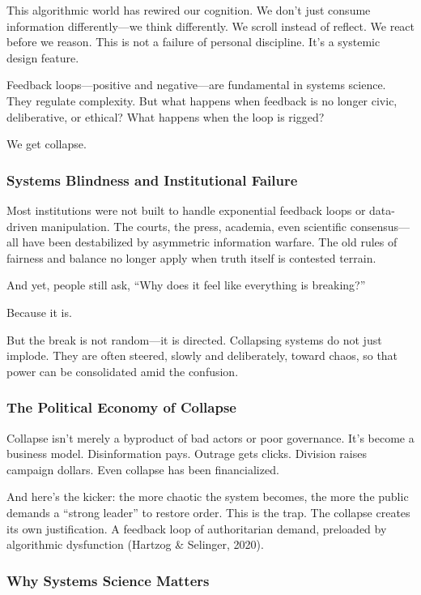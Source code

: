 This algorithmic world has rewired our cognition. We don't just consume information differently---we think differently. We scroll instead of reflect. We react before we reason. This is not a failure of personal discipline. It's a systemic design feature.

Feedback loops---positive and negative---are fundamental in systems science. They regulate complexity. But what happens when feedback is no longer civic, deliberative, or ethical? What happens when the loop is rigged?

We get collapse.

\subsubsection{Systems Blindness and Institutional Failure}\label{systems-blindness-and-institutional-failure}

Most institutions were not built to handle exponential feedback loops or data-driven manipulation. The courts, the press, academia, even scientific consensus---all have been destabilized by asymmetric information warfare. The old rules of fairness and balance no longer apply when truth itself is contested terrain.

And yet, people still ask, ``Why does it feel like everything is breaking?''

Because it is.

But the break is not random---it is directed. Collapsing systems do not just implode. They are often steered, slowly and deliberately, toward chaos, so that power can be consolidated amid the confusion.

\subsubsection{The Political Economy of Collapse}\label{the-political-economy-of-collapse}

Collapse isn't merely a byproduct of bad actors or poor governance. It's become a business model. Disinformation pays. Outrage gets clicks. Division raises campaign dollars. Even collapse has been financialized.

And here's the kicker: the more chaotic the system becomes, the more the public demands a ``strong leader'' to restore order. This is the trap. The collapse creates its own justification. A feedback loop of authoritarian demand, preloaded by algorithmic dysfunction (Hartzog \& Selinger, 2020).

\subsubsection{Why Systems Science Matters}\label{why-systems-science-matters}

